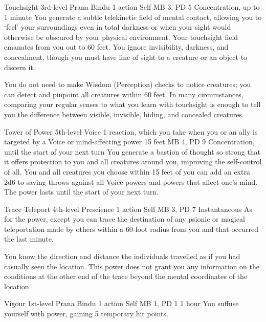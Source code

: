 \DndPowerHeader%
  {Touchsight}
  {3rd-level Prana Bindu}
  {1 action}
  {Self}
  {MB 3, PD 5}
  {Concentration, up to 1 minute}
  You generate a subtle telekinetic field of mental contact,
  allowing you to `feel' your surroundings even in total darkness
  or when your sight would otherwise be obscured
  by your physical environment.
  Your touchsight field emanates from you out to 60 feet.
  You ignore invisibility, darkness, and concealment,
  though you must have line of sight to a creature or an object
  to discern it.
  
  You do not need to make Wisdom (Perception) checks
  to notice creatures; you can detect and pinpoint all creatures
  within 60 feet.
  In many circumstances, comparing your regular senses
  to what you learn with touchsight is enough to tell you
  the difference between visible, invisible, hiding,
  and concealed creatures.

\DndPowerHeader%
  {Tower of Power}
  {5th-level Voice}
  {1 reaction, which you take when you or an ally is
    targeted by a Voice or mind-affecting power}
  {15 feet}
  {MB 4, PD 9}
  {Concentration, until the start of your next turn}
  You generate a bastion of thought so strong
  that it offers protection to you and all creatures around you,
  improving the self-control of all.
  You and all creatures you choose within 15 feet of you
  can add an extra 2d6 to saving throws against all Voice powers
  and powers that affect one's mind.
  The power lasts until the start of your next turn.

\DndPowerHeader%
  {Trace Teleport}
  {4th-level Prescience}
  {1 action}
  {Self}
  {MB 3, PD 7}
  {Instantaneous}
  As for the  power,
  except you can trace the destination of any psionic
  or magical teleportation made by others within
  a 60-foot radius from you
  and that occurred the last minute.

  You know the direction and distance the individuals travelled
  as if you had casually seen the location.
  This power does not grant you any information on the conditions
  at the other end of the trace
  beyond the mental coordinates of the location.

\DndPowerHeader%
  {Vigour}
  {1st-level Prana Bindu}
  {1 action}
  {Self}
  {MB 1, PD 1}
  {1 hour}
You suffuse yourself with power,
gaining 5 temporary hit points.
